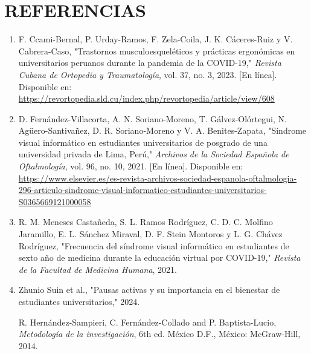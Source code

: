 
\section*{\centering REFERENCIAS}


\begin{enumerate}[leftmargin=1.8em,label=\lbrack\arabic*\rbrack,itemsep=0.6em]

\item F. Ccami-Bernal, P. Urday-Ramos, F. Zela-Coila, J. K. Cáceres-Ruiz y V. Cabrera-Caso, "Trastornos musculoesqueléticos y prácticas ergonómicas en universitarios peruanos durante la pandemia de la COVID-19," \emph{Revista Cubana de Ortopedia y Traumatología}, vol. 37, no. 3, 2023. [En línea]. Disponible en: \url{https://revortopedia.sld.cu/index.php/revortopedia/article/view/608}

\item D. Fernández-Villacorta, A. N. Soriano-Moreno, T. Gálvez-Olórtegui, N. Agüero-Santivañez, D. R. Soriano-Moreno y V. A. Benites-Zapata, "Síndrome visual informático en estudiantes universitarios de posgrado de una universidad privada de Lima, Perú," \emph{Archivos de la Sociedad Española de Oftalmología}, vol. 96, no. 10, 2021. [En línea]. Disponible en: \url{https://www.elsevier.es/es-revista-archivos-sociedad-espanola-oftalmologia-296-articulo-sindrome-visual-informatico-estudiantes-universitarios-S0365669121000058}

\item R. M. Meneses Castañeda, S. L. Ramos Rodríguez, C. D. C. Molfino Jaramillo, E. L. Sánchez Miraval, D. F. Stein Montoros y L. G. Chávez Rodríguez, "Frecuencia del síndrome visual informático en estudiantes de sexto año de medicina durante la educación virtual por COVID-19," \emph{Revista de la Facultad de Medicina Humana}, 2021.

\item Zhunio Suin et al., "Pausas activas y su importancia en el bienestar de estudiantes universitarios," 2024.

R. Hernández-Sampieri, C. Fernández-Collado and P. Baptista-Lucio,
\textit{Metodología de la investigación}, 6th ed.
México D.F., México: McGraw-Hill, 2014.


\end{enumerate}

